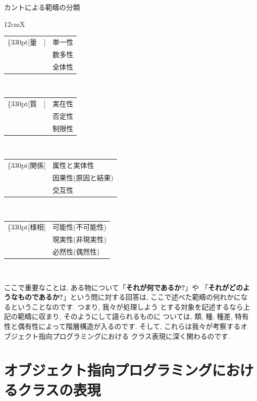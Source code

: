 \documentclass[b5j,8pt,twocolumn]{ltjsarticle}
\begin{document}
\begin{itembox}[c]{カントによる範疇の分類}
{\footnotesize
\begin{tabularx}{12cm}{X}
\begin{tabular}[t]{rl}
\ldelim\{{3}{30pt}[量　]&
単一性\\
&数多性\\
&全体性\\
\end{tabular}
\\
\begin{tabular}[t]{rl}
\ldelim\{{3}{30pt}[質　]&
実在性\\
&否定性\\
&制限性\\
\end{tabular}
\\
\begin{tabular}[t]{rl}
\ldelim\{{3}{30pt}[関係]&
属性と実体性\\
&因果性(原因と結果)\\
&交互性\\
\end{tabular}
\\
\begin{tabular}[t]{rl}
\ldelim\{{3}{30pt}[様相]&
可能性(不可能性)\\
&現実性(非現実性)\\
&必然性(偶然性)\\
\end{tabular}
\\
\end{tabularx}
}
\end{itembox}


ここで重要なことは, ある物について「\textbf{それが何であるか?}」や
「\textbf{それがどのようなものであるか?}」という問に対する回答は,
 ここで述べた範疇の何れかになるということなのです. つまり, 我々が処理しよう
とする対象を記述するなら上記の範疇に収まり, そのようにして語られるものに
ついては, 類, 種, 種差, 特有性と偶有性によって階層構造が入るのです.
 そして, これらは我々が考察するオブジェクト指向プログラミングにおける
クラス表現に深く関わるのです.

\section{オブジェクト指向プログラミングにおけるクラスの表現}
\end{document}
